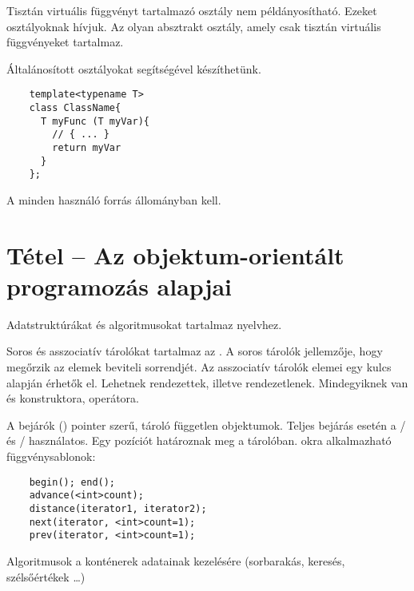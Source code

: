 \documentclass[main.tex]{subfiles}
\begin{document}
  Tisztán virtuális függvényt tartalmazó osztály nem példányosítható.
  Ezeket  osztályoknak hívjuk.
  Az  olyan absztrakt osztály,
  amely csak tisztán virtuális függvényeket tartalmaz.

  Általánosított osztályokat 
  segítségével készíthetünk.
  \begin{lstlisting}
    template<typename T>
    class ClassName{
      T myFunc (T myVar){
        // { ... }
        return myVar
      }
    };
  \end{lstlisting}
  A  minden használó forrás állományban kell.


  \pagebreak
  \section{Tétel – Az objektum-orientált programozás alapjai} %

  Adatstruktúrákat és algoritmusokat tartalmaz
   nyelvhez.

  Soros és asszociatív tárolókat tartalmaz az .
  A soros tárolók jellemzője,
  hogy megőrzik az elemek beviteli sorrendjét.
  Az asszociatív tárolók elemei egy kulcs alapján érhetők el.
  Lehetnek rendezettek, illetve rendezetlenek.
  Mindegyiknek van  és 
  konstruktora, \kkod{=} operátora.

  A bejárók () pointer szerű, tároló
  független objektumok. Teljes bejárás esetén a
  / és
  / használatos.
  Egy pozíciót határoznak meg a tárolóban.
  okra alkalmazható függvénysablonok:
  \begin{lstlisting}
    begin(); end();
    advance(<int>count);
    distance(iterator1, iterator2);
    next(iterator, <int>count=1);
    prev(iterator, <int>count=1);
  \end{lstlisting}

  Algoritmusok a konténerek adatainak kezelésére
  (sorbarakás, keresés, szélsőértékek \dots)
\end{document}
